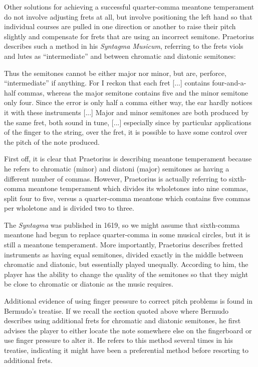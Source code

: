 Other solutions for achieving a successful quarter-comma
meantone
temperament do not involve adjusting frets at all, but involve positioning the left hand
so that individual courses are pulled in one direction or another to raise their pitch
slightly and compensate for frets that are using an incorrect semitone. Praetorius
describes such a method in his \textit{Syntagma Musicum}, referring to the frets viols and
lutes as ``intermediate'' and between chromatic and diatonic semitones:
\begin{blocks}
Thus the semitones cannot be either major nor minor, but are, perforce, ``intermediate''
if anything. For I reckon that each fret [...] contains four-and-a-half commas, whereas
the major semitone contains five and the minor semitone only four. Since the error is
only half a comma either way, the ear hardly notices it with these instruments [...]
Major and minor semitones are both produced by the same fret, both sound in tune, [...]
especially since by particular applications of the finger to the string, over the fret,
it is possible to have some control over the pitch of the note produced.
\autocite[68]{MP:1}
\end{blocks}
First off, it is clear that Praetorius is describing meantone temperament because he
refers to chromatic (minor) and diatoni (major) semitones as having a different number of
commas.  However, Praetorius is actually referring to sixth-comma meantone temperament
which divides its wholetones into nine commas, split four to five, versus a quarter-comma
meantone which contains five commas per wholetone and is divided two to three.

The \textit{Syntagma} was published in 1619, so we might assume that sixth-comma
meantone had begun to replace quarter-comma in some musical circles, but it is still a
meantone temperament.  More importantly, Praetorius describes fretted instruments as
having equal semitones, divided exactly in the middle between chromatic and diatonic,
but essentially played unequally.  According to him, the player has the ability to
change the quality of the semitones so that they might be close to chromatic or
diatonic as the music requires.

Additional evidence of using finger pressure to correct pitch problems is found in
Bermudo's treatise.  If we recall the section quoted above where Bermudo describes
using additional frets for chromatic and diatonic semitones, he first advises the
player to either locate the note somewhere else on the fingerboard or use finger
pressure to alter it.  He refers to this method several times in his treatise,
indicating it might have been a preferential method before resorting to additional
frets. \autocite[106]{DE:1}


